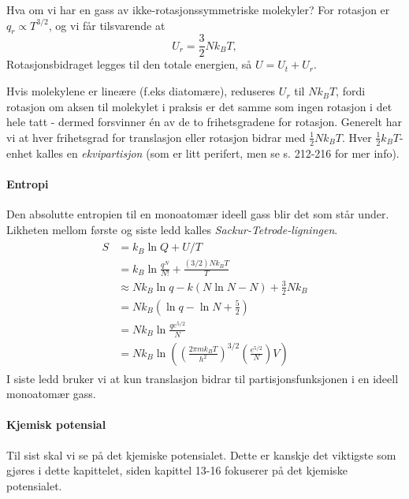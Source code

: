 Hva om vi har en gass av ikke-rotasjonssymmetriske molekyler? For rotasjon er $q_r\propto T^{3/2}$, og vi får tilsvarende at
\begin{equation}
	U_r=\frac{3}{2}Nk_BT,
\end{equation}
Rotasjonsbidraget legges til den totale energien, så $U=U_t+U_r$. 

Hvis molekylene er lineære (f.eks diatomære), reduseres $U_r$ til $Nk_BT$, fordi rotasjon om aksen til molekylet i praksis er det samme som ingen rotasjon i det hele tatt - dermed forsvinner én av de to frihetsgradene for rotasjon. Generelt har vi at hver frihetsgrad for translasjon eller rotasjon bidrar med $\frac{1}{2}Nk_BT$. Hver $\frac{1}{2}k_BT$-enhet kalles en \emph{ekvipartisjon} (som er litt perifert, men se s. 212-216 for mer info).

\paragraph{Entropi} Den absolutte entropien til en monoatomær ideell gass blir det som står under. Likheten mellom første og siste ledd kalles \emph{Sackur-Tetrode-ligningen}.
\begin{align}
\begin{split}
	S &= k_B\ln Q + U/T \\
	&= k_B\ln\frac{q^N}{N!} + \frac{(3/2)Nk_BT}{T} \\
	&\approx Nk_B\ln q-k(N\ln N - N) + \frac{3}{2}Nk_B \\
	&=Nk_B\left(\ln q - \ln N + \frac{5}{2}\right) \\
	&=Nk_B\ln\frac{qe^{5/2}}{N} \\
	&=Nk_B\ln\left(\left(\frac{2\pi mk_BT}{h^2}\right)^{3/2}\left(\frac{e^{5/2}}{N}\right)V\right)
\end{split}
\end{align}
I siste ledd bruker vi at kun translasjon bidrar til partisjonsfunksjonen i en ideell monoatomær gass.

\paragraph{Kjemisk potensial} Til sist skal vi se på det kjemiske potensialet. Dette er kanskje det viktigste som gjøres i dette kapittelet, siden kapittel 13-16 fokuserer på det kjemiske potensialet. 

